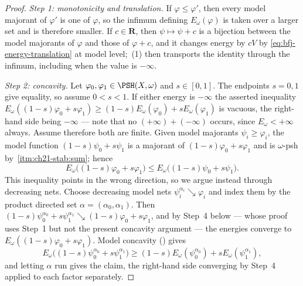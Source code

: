 \begin{proof}
\emph{Step 1: monotonicity and translation.}  If $\varphi\leq\varphi'$, then
every model majorant of $\varphi'$ is one of $\varphi$, so the infimum
defining $E_\omega(\varphi)$ is taken over a larger set and is therefore
smaller.  If $c\in\mathbf R$, then $\psi\mapsto\psi+c$ is a bijection
between the model majorants of $\varphi$ and those of $\varphi+c$, and it
changes energy by $cV$ by \eqref{eq:bfj-energy-translation} at model level;
\,(1) then transports the identity through the
infimum, including when the value is $-\infty$.

\emph{Step 2: concavity.}  Let $\varphi_0,\varphi_1\in\PSH(X,\omega)$ and
$s\in[0,1]$.  The endpoints $s=0,1$ give equality, so assume
$0<s<1$.  If either energy is $-\infty$ the asserted inequality
$E_\omega((1-s)\varphi_0+s\varphi_1)\geq(1-s)E_\omega(\varphi_0)+sE_\omega(\varphi_1)$
is vacuous, the right-hand side being $-\infty$ --- note that no
$(+\infty)+(-\infty)$ occurs, since $E_\omega<+\infty$ always.  Assume
therefore both are finite.  Given model majorants $\psi_i\geq\varphi_i$,
the model function $(1-s)\psi_0+s\psi_1$ is a majorant of
$(1-s)\varphi_0+s\varphi_1$ and is $\omega$-psh by
\,\cref{itm:ch21-stab:sum}; hence
\[
 E_\omega\bigl((1-s)\varphi_0+s\varphi_1\bigr)
 \leq E_\omega\bigl((1-s)\psi_0+s\psi_1\bigr).
\]
This inequality points in the wrong direction, so we argue instead through
decreasing nets.  Choose decreasing model nets
$\psi_i^{\alpha_i}\searrow\varphi_i$ and index them by the product directed
set $\alpha=(\alpha_0,\alpha_1)$.  Then
$(1-s)\psi_0^{\alpha_0}+s\psi_1^{\alpha_1}
\searrow(1-s)\varphi_0+s\varphi_1$, and by Step~4 below --- whose proof uses
Step~1 but not the present concavity argument --- the energies converge to
$E_\omega((1-s)\varphi_0+s\varphi_1)$.  Model concavity
() gives
\[
 E_\omega\bigl((1-s)\psi_0^{\alpha_0}+s\psi_1^{\alpha_1}\bigr)
 \geq(1-s)E_\omega(\psi_0^{\alpha_0})
       +sE_\omega(\psi_1^{\alpha_1}),
\]
and letting $\alpha$ run gives the claim, the right-hand side converging by
Step~4 applied to each factor separately.


\end{proof}
